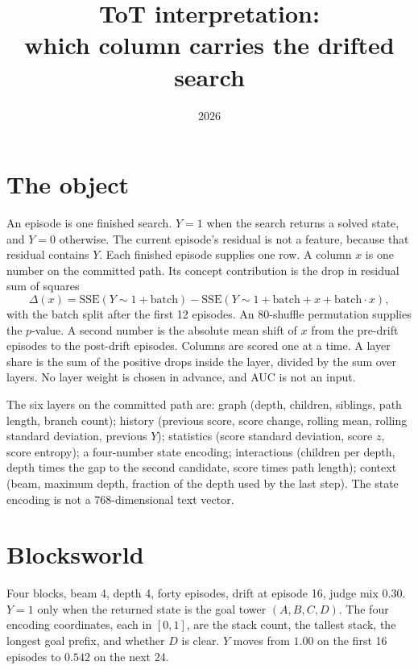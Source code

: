 \documentclass[11pt,a4paper]{article}
\title{ToT interpretation:\\
which column carries the drifted search}
\author{}
\date{2026}
\begin{document}
\maketitle

\section{The object}
An episode is one finished search.
\(Y=1\) when the search returns a solved state, and \(Y=0\) otherwise.
The current episode's residual is not a feature, because that residual contains \(Y\).
Each finished episode supplies one row.
A column \(x\) is one number on the committed path.
Its concept contribution is the drop in residual sum of squares
\[
\Delta(x)
=
\mathrm{SSE}(Y\sim 1+\mathrm{batch})
-
\mathrm{SSE}(Y\sim 1+\mathrm{batch}+x+\mathrm{batch}\cdot x),
\]
with the batch split after the first 12 episodes.
An 80-shuffle permutation supplies the \(p\)-value.
A second number is the absolute mean shift of \(x\) from the pre-drift episodes to the post-drift episodes.
Columns are scored one at a time.
A layer share is the sum of the positive drops inside the layer, divided by the sum over layers.
No layer weight is chosen in advance, and AUC is not an input.

The six layers on the committed path are:
graph (depth, children, siblings, path length, branch count);
history (previous score, score change, rolling mean, rolling standard deviation, previous \(Y\));
statistics (score standard deviation, score \(z\), score entropy);
a four-number state encoding;
interactions (children per depth, depth times the gap to the second candidate, score times path length);
context (beam, maximum depth, fraction of the depth used by the last step).
The state encoding is not a 768-dimensional text vector.

\section{Blocksworld}
Four blocks, beam 4, depth 4, forty episodes, drift at episode 16, judge mix \(0.30\).
\(Y=1\) only when the returned state is the goal tower \((A,B,C,D)\).
The four encoding coordinates, each in \([0,1]\), are the stack count, the tallest stack, the longest goal prefix, and whether \(D\) is clear.
\(Y\) moves from \(1.00\) on the first 16 episodes to \(0.542\) on the next 24.
\end{document}
